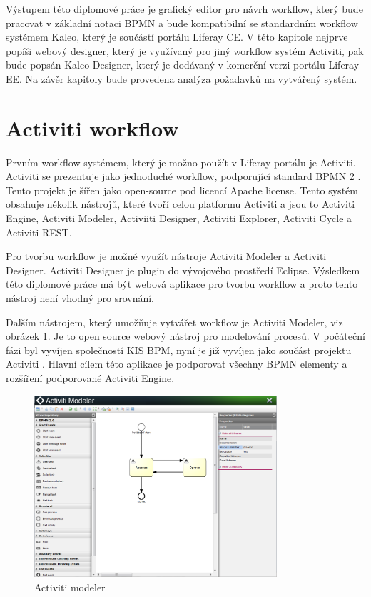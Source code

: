 \documentclass{fithesis}
\begin{document}
Výstupem této diplomové práce je grafický editor pro návrh workflow, který bude pracovat v základní notaci BPMN a bude kompatibilní se standardním workflow systémem Kaleo, který je součástí portálu Liferay CE. V této kapitole nejprve popíši webový designer, který je využívaný pro jiný workflow systém Activiti, pak bude popsán Kaleo Designer, který je dodávaný v komerční verzi portálu Liferay EE. Na závěr kapitoly bude provedena analýza požadavků na vytvářený systém.

\section{Activiti workflow}
Prvním workflow systémem, který je možno použít v Liferay portálu je Activiti. Activiti se prezentuje jako jednoduché workflow, podporující standard BPMN 2 \cite{activiti}. Tento projekt je šířen jako open-source pod licencí Apache license. Tento systém obsahuje několik nástrojů, které tvoří celou platformu Activiti a jsou to Activiti Engine, Activiti Modeler, Activiiti Designer, Activiti Explorer, Activiti Cycle a Activiti REST.

Pro tvorbu workflow je možné využít nástroje Activiti Modeler a Activiti Designer. Activiti Designer je plugin do vývojového prostředí Eclipse. Výsledkem této diplomové práce má být webová aplikace pro tvorbu workflow a proto tento nástroj není vhodný pro srovnání. 

Dalším nástrojem, který umožňuje vytvářet workflow je  Activiti Modeler, viz obrázek  \ref{fig:activiti_modeler}. Je to open source webový nástroj pro modelování procesů. V počáteční fázi byl vyvíjen společností KIS BPM, nyní je již vyvíjen jako součást projektu Activiti \cite{activiti}. Hlavní cílem této aplikace je podporovat všechny BPMN elementy a rozšíření podporované Activiti Engine. 

\begin{figure}[htp]
\centering
\includegraphics[width=340px]{images/activiti_modeler.png}
\caption{Activiti modeler}
\label{fig:activiti_modeler}
\end{figure}
\end{document}
